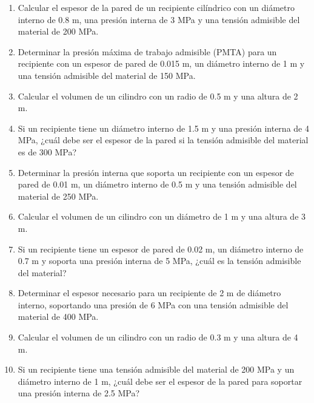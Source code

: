 \documentclass[../main]{subfiles}
\begin{document}
\begin{enumerate}
\item Calcular el espesor de la pared de un recipiente cilíndrico con un diámetro interno de 0.8 m, una presión interna de 3 MPa y una tensión admisible del material de 200 MPa.
\item Determinar la presión máxima de trabajo admisible (PMTA) para un recipiente con un espesor de pared de 0.015 m, un diámetro interno de 1 m y una tensión admisible del material de 150 MPa.
\item Calcular el volumen de un cilindro con un radio de 0.5 m y una altura de 2 m.
\item Si un recipiente tiene un diámetro interno de 1.5 m y una presión interna de 4 MPa, ¿cuál debe ser el espesor de la pared si la tensión admisible del material es de 300 MPa?
\item Determinar la presión interna que soporta un recipiente con un espesor de pared de 0.01 m, un diámetro interno de 0.5 m y una tensión admisible del material de 250 MPa.
\item Calcular el volumen de un cilindro con un diámetro de 1 m y una altura de 3 m.
\item Si un recipiente tiene un espesor de pared de 0.02 m, un diámetro interno de 0.7 m y soporta una presión interna de 5 MPa, ¿cuál es la tensión admisible del material?
\item Determinar el espesor necesario para un recipiente de 2 m de diámetro interno, soportando una presión de 6 MPa con una tensión admisible del material de 400 MPa.
\item Calcular el volumen de un cilindro con un radio de 0.3 m y una altura de 4 m.
\item Si un recipiente tiene una tensión admisible del material de 200 MPa y un diámetro interno de 1 m, ¿cuál debe ser el espesor de la pared para soportar una presión interna de 2.5 MPa?
\end{enumerate}
\end{document}
